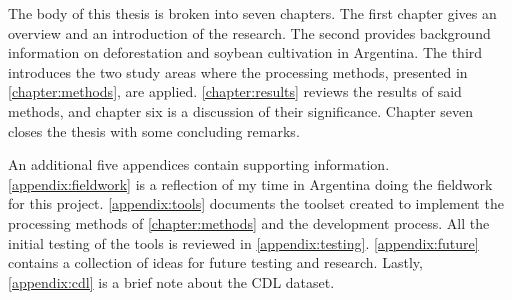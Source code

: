 The body of this thesis is broken into seven chapters. The first chapter gives an overview and an introduction of the research. The second provides background information on deforestation and soybean cultivation in Argentina. The third introduces the two study areas where the processing methods, presented in \autoref{chapter:methods}, are applied. \autoref{chapter:results} reviews the results of said methods, and chapter six is a discussion of their significance. Chapter seven closes the thesis with some concluding remarks.

An additional five appendices contain supporting information. \autoref{appendix:fieldwork} is a reflection of my time in Argentina doing the fieldwork for this project. \autoref{appendix:tools} documents the toolset created to implement the processing methods of \autoref{chapter:methods} and the development process. All the initial testing of the tools is reviewed in \autoref{appendix:testing}. \autoref{appendix:future} contains a collection of ideas for future testing and research. Lastly, \autoref{appendix:cdl} is a brief note about the CDL dataset.